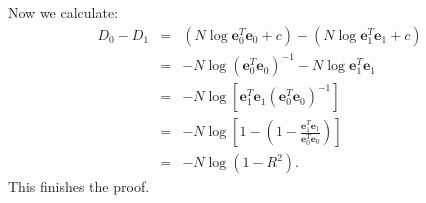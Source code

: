 \documentclass[a4paper, 11pt]{article}
\begin{document}
Now we calculate:
\begin{eqnarray}
D_0 - D_1 &=& (N \log \mathbf{e}_{0}^{T} \mathbf{e}_{0} + c) - (N \log \mathbf{e}_{1}^{T} \mathbf{e}_{1} + c) \nonumber \\
&=& - N \log (\mathbf{e}_{0}^{T} \mathbf{e}_{0})^{-1} - N \log \mathbf{e}_{1}^{T} \mathbf{e}_{1} \nonumber \\
&=& - N \log \left[ \mathbf{e}_{1}^{T} \mathbf{e}_{1} (\mathbf{e}_{0}^{T} \mathbf{e}_{0})^{-1} \right] \nonumber \\
&=& - N \log \left[ 1 - \left(1 - \frac{\mathbf{e}_{1}^{T} \mathbf{e}_{1}}{ \mathbf{e}_{0}^{T} \mathbf{e}_{0}} \right) \right] \nonumber \\
&=& -N  \log \left(1 - R^2 \right). \nonumber
\end{eqnarray}
This finishes the proof.
\end{document}
